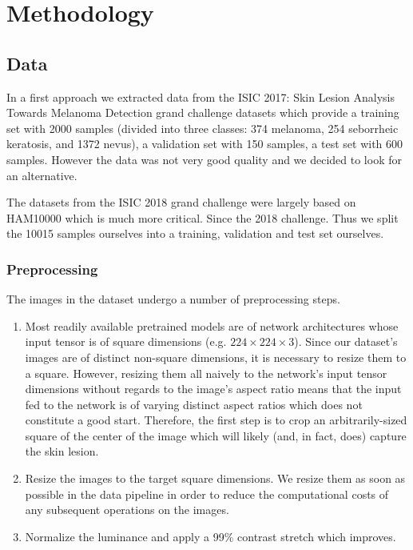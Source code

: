 \chapter{Methodology}
\label{chapter:methodology}

\section{Data}

In a first approach we extracted data from the ISIC 2017: Skin Lesion Analysis Towards Melanoma Detection grand challenge datasets \cite{isic2017} which provide a training set with 2000 samples (divided into three classes: 374 melanoma, 254 seborrheic keratosis, and 1372 nevus), a validation set with 150 samples, a test set with 600 samples. However the data was not very good quality and we decided to look for an alternative.

The datasets from the ISIC 2018 grand challenge were largely based on HAM10000\cite{ham10000} which is much more critical. Since the 2018 challenge. Thus we split the 10015 samples ourselves into a training, validation and test set ourselves.

\subsection{Preprocessing}
\label{subsection:preprocessing}

The images in the dataset undergo a number of preprocessing steps.

\begin{enumerate}
    \item Most readily available pretrained models are of network architectures whose input tensor is of square dimensions (e.g. $224 \times 224 \times 3$). Since our dataset's images are of distinct non-square dimensions, it is necessary to resize them to a square. However, resizing them all naively to the network's input tensor dimensions without regards to the image's aspect ratio means that the input fed to the network is of varying distinct aspect ratios which does not constitute a good start. Therefore, the first step is to crop an arbitrarily-sized square of the center of the image which will likely (and, in fact, does) capture the skin lesion.
    \item Resize the images to the target square dimensions. We resize them as soon as possible in the data pipeline in order to reduce the computational costs of any subsequent operations on the images.
    \item Normalize the luminance and apply a 99\% contrast stretch which improves.
\end{enumerate}



